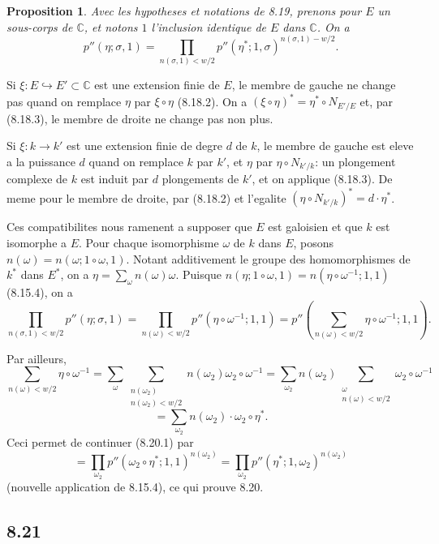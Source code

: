 \documentclass[12pt,a4paper]{article}
\theoremstyle{plain}
\newtheorem{proposition}[theorem]{Proposition}
\theoremstyle{definition}
\theoremstyle{remark}
\newcommand{\C}{\mathbb{C}}
\begin{document}
\begin{proposition}\label{prop:8.20}
Avec les hypotheses et notations de 8.19, prenons pour $E$ un sous-corps de $\C$,
et notons $1$ l'inclusion identique de $E$ dans $\C$. On a
\[
p''(\eta; \sigma, 1) = \prod_{n(\sigma,1) < w/2} p''(\eta^*; 1, \sigma)^{n(\sigma,1) - w/2}.
\]
\end{proposition}

Si $\xi: E \hookrightarrow E' \subset \C$ est une extension finie de $E$, le membre de gauche ne
change pas quand on remplace $\eta$ par $\xi \circ \eta$ (8.18.2). On a $(\xi \circ \eta)^* = \eta^* \circ
N_{E'/E}$ et, par (8.18.3), le membre de droite ne change pas non plus.

Si $\xi: k \to k'$ est une extension finie de degre $d$ de $k$, le membre de gauche est
eleve a la puissance $d$ quand on remplace $k$ par $k'$, et $\eta$ par $\eta \circ N_{k'/k}$: un
plongement complexe de $k$ est induit par $d$ plongements de $k'$, et on applique
(8.18.3). De meme pour le membre de droite, par (8.18.2) et l'egalite
$(\eta \circ N_{k'/k})^* = d \cdot \eta^*$.

Ces compatibilites nous ramenent a supposer que $E$ est galoisien et que $k$ est
isomorphe a $E$. Pour chaque isomorphisme $\omega$ de $k$ dans $E$, posons
$n(\omega) = n(\omega; 1 \circ \omega, 1)$. Notant additivement le groupe des homomorphismes
de $k^*$ dans $E^*$, on a $\eta = \sum_\omega n(\omega) \omega$. Puisque
$n(\eta; 1 \circ \omega, 1) = n(\eta \circ \omega^{-1}; 1, 1)$ (8.15.4), on a
\begin{equation}\label{eq:8.20.1}
\prod_{n(\sigma,1) < w/2} p''(\eta; \sigma, 1) = \prod_{n(\omega) < w/2} p''(\eta \circ \omega^{-1}; 1, 1)
= p''\left(\sum_{n(\omega) < w/2} \eta \circ \omega^{-1}; 1, 1\right).
\end{equation}

Par ailleurs,
\[
\sum_{n(\omega) < w/2} \eta \circ \omega^{-1} = \sum_{\omega} \sum_{\substack{n(\omega_2) \\ n(\omega_2) < w/2}} n(\omega_2) \omega_2 \circ \omega^{-1}
= \sum_{\omega_2} n(\omega_2) \sum_{\substack{\omega \\ n(\omega) < w/2}} \omega_2 \circ \omega^{-1}
\]
\[
= \sum_{\omega_2} n(\omega_2) \cdot \omega_2 \circ \eta^*.
\]
Ceci permet de continuer (8.20.1) par
\[
= \prod_{\omega_2} p''(\omega_2 \circ \eta^*; 1, 1)^{n(\omega_2)} = \prod_{\omega_2} p''(\eta^*; 1, \omega_2)^{n(\omega_2)}
\]
(nouvelle application de 8.15.4), ce qui prouve 8.20.

\subsection*{8.21}
\end{document}

